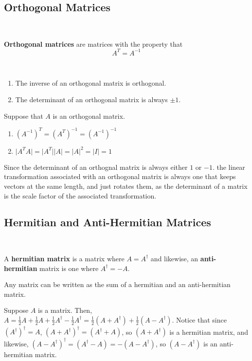 \documentclass{article}
\begin{document}
\subsection{Orthogonal Matrices}
\ 
\begin{definition}
\textbf{Orthogonal matrices} are matrices with the property that $$A^T = A ^{-1}$$ 
\end{definition}

\begin{proposition}
    \ 
\begin{enumerate}
    \item The inverse of an orthogonal matrix is orthogonal.
    \item The determinant of an orthogonal matrix is always $\pm 1$.
\end{enumerate}
\end{proposition}

\begin{customproof}
Suppose that $A$ is an orthogonal matrix.
\begin{enumerate}
    \item $(A ^{-1})^T =(A^T)^{-1} = (A ^{-1} )^{-1}$
    \item $\vert A^T A \vert = \vert A^T\vert \vert A\vert = \vert A\vert^2 = \vert I\vert = 1$   
\end{enumerate}
\end{customproof}
Since the determinant of an orthognal matrix is always either $1$ or $-1$. 
the linear transformation associated with an orthogonal matrix is always one that keeps vectors at the same length, and just rotates them, as the determinant of a matrix is the scale factor of the associated transformation.

\subsection{Hermitian and Anti-Hermitian Matrices}
\ 
\begin{definition}[Hermitian Matrices]
A \textbf{hermitian matrix} is a matrix where $A = A^\dagger$ and likewise, an \textbf{anti-hermitian} matrix is one where $A^\dagger = -A$.   
\end{definition}

\begin{proposition}
Any matrix can be written as the sum of a hermitian and an anti-hermitian matrix.
\end{proposition}

\begin{customproof}
Suppose $A$ is a matrix. Then, $A = \frac{1}{2}A + \frac{1}{2}A + \frac{1}{2}A^\dagger - \frac{1}{2}A^\dagger = \frac{1}{2}(A+A^\dagger) + \frac{1}{2}(A-A^\dagger)$. Notice that since $(A^\dagger)^\dagger = A$, $(A+A^\dagger)^\dagger = (A^\dagger + A)$, so $(A + A^\dagger)$ is a hermitian matrix, and likewise, $(A - A^\dagger)^\dagger = (A^\dagger - A) = -(A-A^\dagger)$, so $(A-A^\dagger)$ is an anti-hermitian matrix. 
\end{customproof}
\end{document}
